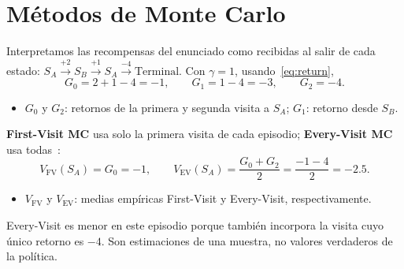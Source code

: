 \section{Métodos de Monte Carlo}
Interpretamos las recompensas del enunciado como recibidas al salir de cada estado: $S_A\xrightarrow{+2}S_B\xrightarrow{+1}S_A\xrightarrow{-4}\text{Terminal}$. Con $\gamma=1$, usando~\eqref{eq:return},
\begin{equation}\label{eq:mc-returns}
    G_0=2+1-4=-1,\qquad G_1=1-4=-3,\qquad G_2=-4.
\end{equation}
\begin{itemize}
    \item $G_0$ y $G_2$: retornos de la primera y segunda visita a $S_A$; $G_1$: retorno desde $S_B$.
\end{itemize}

\textbf{First-Visit MC} usa solo la primera visita de cada episodio; \textbf{Every-Visit MC} usa todas~\cite[secc.~5.1]{sutton}:
\begin{equation}\label{eq:mc-estimates}
    V_{\mathrm{FV}}(S_A)=G_0=-1,\qquad
    V_{\mathrm{EV}}(S_A)=\frac{G_0+G_2}{2}=\frac{-1-4}{2}=-2.5.
\end{equation}
\begin{itemize}
    \item $V_{\mathrm{FV}}$ y $V_{\mathrm{EV}}$: medias empíricas First-Visit y Every-Visit, respectivamente.
\end{itemize}
Every-Visit es menor en este episodio porque también incorpora la visita cuyo único retorno es $-4$. Son estimaciones de una muestra, no valores verdaderos de la política.

